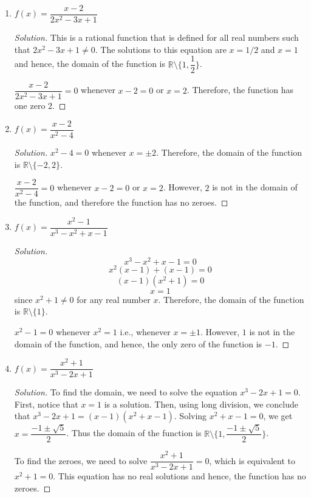 \documentclass[12pt]{article}
\newenvironment{solution}{\begin{proof}[Solution]}{\end{proof}}
\begin{document}
\begin{enumerate}
\begin{enumerate}
\begin{solution}
				The zeroes are $-1$ and $2$, obtained by solving the equation $\dfrac{x^2-x-2}{5}=0$.
			\end{solution}
			\item $f(x)=\dfrac{x-2}{2x^2-3x+1}$
			\begin{solution}
				This is a rational function that is defined for all real numbers such that $2x^2-3x+1\neq0$. The solutions to this equation are $x=1/2$ and $x=1$ and hence, the domain of the function is $\mathbb{R} \setminus \{1,\dfrac{1}{2}\}$.
				
				$\dfrac{x-2}{2x^2-3x+1}=0$ whenever $x-2=0$ or $x=2$. Therefore, the function has one zero $2$. 
			\end{solution}
			\item $f(x)=\dfrac{x-2}{x^2-4}$
			\begin{solution}
				$x^2-4=0$ whenever $x=\pm 2$. Therefore, the domain of the function is $\mathbb{R}\setminus \{-2,2\}$.
				
				$\dfrac{x-2}{x^2-4}=0$ whenever $x-2=0$ or $x=2$. However, $2$ is not in the domain of the function, and therefore the function has no zeroes.
			\end{solution}
			\item $f(x)=\dfrac{x^2-1}{x^3-x^2+x-1}$
			\begin{solution}
				$$x^3-x^2+x-1=0$$
				$$x^2(x-1)+(x-1)=0$$
				$$(x-1)(x^2+1)=0$$
				$$x=1$$
				since $x^2+1\neq 0$ for any real number $x$. Therefore, the domain of the function is $\mathbb{R}\setminus \{1\}$.
				
				$x^2-1=0$ whenever $x^2=1$ i.e., whenever $x=\pm1$. However, $1$ is not in the domain of the function, and hence, the only zero of the function is $-1$.
			\end{solution}
			\item $f(x)=\dfrac{x^2+1}{x^3-2x+1}$
			\begin{solution}
				To find the domain, we need to solve the equation $x^3-2x+1=0$. First, notice that $x=1$ is a solution. Then, using long division, we conclude that $x^3-2x+1=(x-1)(x^2+x-1)$. Solving $x^2+x-1=0$, we get $x=\dfrac{-1\pm\sqrt{5}}{2}$. Thus the domain of the function is $\mathbb{R}\setminus \{1,\dfrac{-1\pm\sqrt{5}}{2}\}$.
				
				To find the zeroes, we need to solve $\dfrac{x^2+1}{x^3-2x+1}=0$, which is equivalent to $x^2+1=0$. This equation has no real solutions and hence, the function has no zeroes.
			\end{solution}
	

\end{enumerate}
\end{enumerate}
\end{document}
